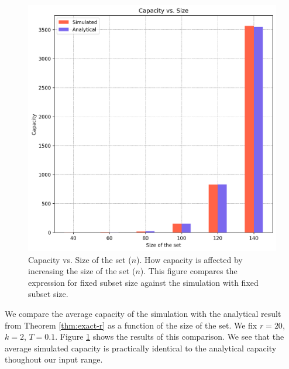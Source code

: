 \begin{figure}%
    \centering
    \includegraphics[scale=0.8]{figures/cap-vs-n.png}
    \caption[Capacity vs. Size of the set ($n$)]{Capacity vs. Size of the set ($n$). \textmd{How capacity is affected by increasing the size of the set ($n$). This figure compares the expression for fixed subset size against the simulation with fixed subset size.}}
    \label{figure:cap-vs-n}
    \end{figure}

We compare the average capacity of the simulation with the analytical result from Theorem \ref{thm:exact-r} as a function of the size of the set. We fix $r=20$, $k=2$, $T=0.1$. Figure \ref{figure:cap-vs-n} shows the results of this comparison. We see that the average simulated capacity is practically identical to the analytical capacity thoughout our input range.


